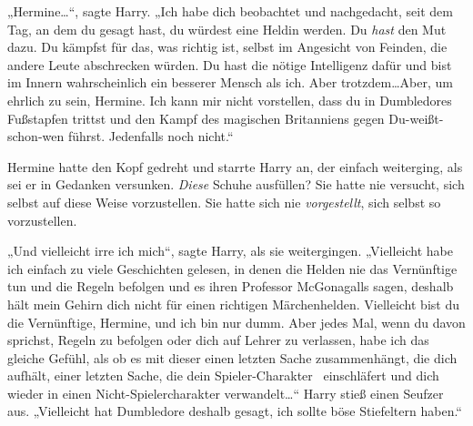 „Hermine…“, sagte Harry. „Ich habe dich beobachtet und nachgedacht, seit dem Tag, an dem du gesagt hast, du würdest eine Heldin werden. Du \emph{hast} den Mut dazu. Du kämpfst für das, was richtig ist, selbst im Angesicht von Feinden, die andere Leute abschrecken würden. Du hast die nötige Intelligenz dafür und bist im Innern wahrscheinlich ein besserer Mensch als ich. Aber trotzdem…Aber, um ehrlich zu sein, Hermine. Ich kann mir nicht vorstellen, dass du in Dumbledores Fußstapfen trittst und den Kampf des magischen Britanniens gegen Du-weißt-schon-wen führst. Jedenfalls noch nicht.“

Hermine hatte den Kopf gedreht und starrte Harry an, der einfach weiterging, als sei er in Gedanken versunken. \emph{Diese} Schuhe ausfüllen? Sie hatte nie versucht, sich selbst auf diese Weise vorzustellen. Sie hatte sich nie \emph{vorgestellt}, sich selbst so vorzustellen.

„Und vielleicht irre ich mich“, sagte Harry, als sie weitergingen. „Vielleicht habe ich einfach zu viele Geschichten gelesen, in denen die Helden nie das Vernünftige tun und die Regeln befolgen und es ihren Professor McGonagalls sagen, deshalb hält mein Gehirn dich nicht für einen richtigen Märchenhelden. Vielleicht bist du die Vernünftige, Hermine, und ich bin nur dumm. Aber jedes Mal, wenn du davon sprichst, Regeln zu befolgen oder dich auf Lehrer zu verlassen, habe ich das gleiche Gefühl, als ob es mit dieser einen letzten Sache zusammenhängt, die dich aufhält, einer letzten Sache, die dein Spieler-Charakter ~einschläfert und dich wieder in einen Nicht-Spielercharakter verwandelt…“ Harry stieß einen Seufzer aus. „Vielleicht hat Dumbledore deshalb gesagt, ich sollte böse Stiefeltern haben.“

